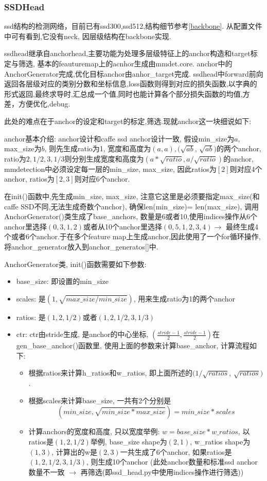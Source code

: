\documentclass[UTF8]{ctexart}
\begin{document}
\subsubsection{SSDHead}
ssd结构的检测网络，目前已有ssd300,ssd512,结构细节参考\ref{backbone}. 从配置文件中可有看到,它没有neck,
因层级结构在backbone实现.

ssdhead继承自anchorhead,主要功能为处理多层级特征上的anchor构造和target标定与筛选,
基本的feauturemap上的acnhor生成由mmdet.core.
anchor中的AnchorGenerator完成,优化目标anchor由anhor\_target完成.
ssdhead中forward前向返回各层级对应的类别分数和坐标信息,loss函数则得到对应的损失函数,以字典的形式返回,最终求导时,汇总成一个值,同时也能计算各个部分损失函数的均值,方差，方便优化,debug.

此处的难点在于anchor的设定和target的标定,筛选.现就anchor这一块细说如下:

anchor基本介绍: anchor设计和caffe ssd anchor设计一致, 假设min\_size为$a$, max\_size为$b$, 则先生成ratio为1, 宽度和高度为$(a, a), (\sqrt{ab}$, 
$\sqrt{ab})$的两个anchor, ratio为$2, 1/2, 3, 1/3$则分别生成宽度和高度为$(a*\sqrt{ratio}, a/\sqrt{ratio})$的anchor, mmdetection中必须设定每一层的min\_size, max\_size, 因此ratios为$[2]$则对应4个anchor, ratios为$[2,3]$则对应6个anchor.

在init()函数中,先生成min\_size, max\_size, 注意它这里是必须要指定max\_size(和caffe SSD不同,无法生成奇数个anchor), 确保len(min\_size)=
len(max\_size), 调用AnchorGenerator()类生成了base\_anchors, 数量是6或者10,使用indices操作从6个anchor里选择$(0, 3, 1, 2)$或者从10个anchor里选择$(0, 5, 1, 2, 3, 4) $$\rightarrow$ 最终生成4个或者6个anchor.于在多个feature map上生成anchor,因此使用了一个for循环操作, 将anchor\_generator放入到anchor\_generatos[]中.


AnchorGenerator类, init()函数需要如下参数:

\begin{itemize}
	\item base\_size: 即设置的min\_size
	\item scales: 是$(1, \sqrt{max\_size / min\_size})$, 用来生成ratio为1的两个anchor
	\item ratios: 是$(1, 2, 1/2)$或者$(1, 2, 1/2, 3, 1/3)$
	\item ctr: ctr由stride生成, 是anchor的中心坐标, $(\frac{stride - 1}{2}, \frac{stride - 1}{2} ) $在gen\_base\_anchor()函数里, 使用上面的参数来计算base\_anchor, 计算流程如下:
	\begin{itemize}
		\item 根据ratios来计算h\_ratios和w\_ratios, 即上面所述的$(1 / \sqrt{ratios}$, $\sqrt{ratios}) $.
		\item 根据scales来计算base\_size, 一共有2个分别是$$(min\_size, \sqrt{min\_size * max\_size}) = min\_size * scales$$
		\item 计算anchors的宽度和高度, 只以宽度举例: $w = base\_size * w\_ratios$, 以ratios是$(1, 2, 1/2)$举例, base\_size shape为$(2, 1)$, w\_ratios shape为$(1, 3)$, 
		计算出的w是$(2, 3) $一共生成了6个anchor, 如果ratios是$(1, 2, 1/2, 3, 1/3)$, 则生成10个anchor (此处anchor数量和标准ssd anchor数量不一致 $\rightarrow$
		 再筛选(即ssd\_head.py中使用indices操作进行筛选))
	\end{itemize}
	
\end{itemize}
\end{document}
